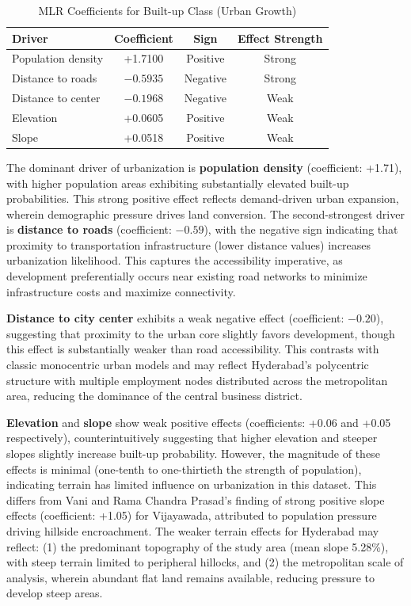 \documentclass[12pt,a4paper]{article}
\begin{document}
\begin{table}[H]
\caption{MLR Coefficients for Built-up Class (Urban Growth)}
\label{tab:mlr_coefficients}
\centering
\small
\renewcommand{\arraystretch}{1.2}
\begin{tabular}{lccc}
\toprule
\textbf{Driver} & \textbf{Coefficient} & \textbf{Sign} & \textbf{Effect Strength} \\
\midrule
Population density & +1.7100 & Positive & Strong \\
Distance to roads & $-0.5935$ & Negative & Strong \\
Distance to center & $-0.1968$ & Negative & Weak \\
Elevation & +0.0605 & Positive & Weak \\
Slope & +0.0518 & Positive & Weak \\
\bottomrule
\end{tabular}
\end{table}

The dominant driver of urbanization is \textbf{population density} (coefficient: +1.71), with higher population areas exhibiting substantially elevated built-up probabilities. This strong positive effect reflects demand-driven urban expansion, wherein demographic pressure drives land conversion. The second-strongest driver is \textbf{distance to roads} (coefficient: $-0.59$), with the negative sign indicating that proximity to transportation infrastructure (lower distance values) increases urbanization likelihood. This captures the accessibility imperative, as development preferentially occurs near existing road networks to minimize infrastructure costs and maximize connectivity.

\textbf{Distance to city center} exhibits a weak negative effect (coefficient: $-0.20$), suggesting that proximity to the urban core slightly favors development, though this effect is substantially weaker than road accessibility. This contrasts with classic monocentric urban models and may reflect Hyderabad's polycentric structure with multiple employment nodes distributed across the metropolitan area, reducing the dominance of the central business district.

\textbf{Elevation} and \textbf{slope} show weak positive effects (coefficients: +0.06 and +0.05 respectively), counterintuitively suggesting that higher elevation and steeper slopes slightly increase built-up probability. However, the magnitude of these effects is minimal (one-tenth to one-thirtieth the strength of population), indicating terrain has limited influence on urbanization in this dataset. This differs from Vani and Rama Chandra Prasad's \cite{vani2022} finding of strong positive slope effects (coefficient: +1.05) for Vijayawada, attributed to population pressure driving hillside encroachment. The weaker terrain effects for Hyderabad may reflect: (1) the predominant topography of the study area (mean slope 5.28\%), with steep terrain limited to peripheral hillocks, and (2) the metropolitan scale of analysis, wherein abundant flat land remains available, reducing pressure to develop steep areas.
\end{document}
